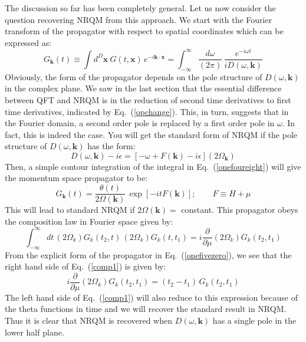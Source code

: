 \documentclass{article}
\def\eq#1{{Eq.~(\ref{#1})}}
\begin{document}
The discussion so far has been completely general. Let us now consider the question recovering NRQM from this approach. We start with the Fourier transform of the propagator with respect to spatial coordinates which can be expressed as:
\begin{equation}
 G_{\bm{k}} (t) \equiv \int d^D \bm{x}\ G(t,\bm{x})\, e^{-i\bm{k\cdot x}} = \int_{-\infty}^\infty \frac{d\omega}{(2\pi)} \, \frac{e^{-i\omega t}}{iD(\omega, \bm{k})} 
 \label{onefoureight}
\end{equation}
Obviously, the form of the propagator depends on the pole structure of $D(\omega, \bm{k})$ in the complex plane. We saw in the last section that the essential difference between QFT and NRQM is in the reduction of second time derivatives to first time derivatives, indicated by \eq{opchange}. This, in turn, suggests that in the Fourier domain, a second order pole is replaced by a first order pole in $\omega$. In fact,  
this is indeed the case.
You will get the standard form of NRQM if the pole structure of $D(\omega, \bm{k})$ has the form:
\begin{equation}
 D(\omega, \bm{k} ) - i \epsilon = \left[ - \omega + F(\bm{k}) - i \epsilon\right] (2\Omega_{\bm{k}})
\end{equation}
Then, a simple contour integration of the integral in \eq{onefoureight} will give the momentum space propagator to be:
\begin{equation}
G_{\bm{k}} (t) = \frac{\theta(t)}{2\Omega(\bm{k})} \, \exp\left[ - i t F(\bm{k})\right]; \qquad F\equiv H + \mu 
\label{onefivezero}
\end{equation} 
This will lead to standard NRQM if $2 \Omega(\bm{k})=$ constant. This propagator obeys  the composition law in Fourier space given by:
\begin{equation}
 \int_{-\infty}^\infty dt\, (2\Omega_k) G_k(t_2,t) \, (2\Omega_k) G_k(t,t_1) = i \frac{\partial}{\partial \mu} (2\Omega_k) G_k(t_2,t_1)
 \label{comp1}
\end{equation} 
From the explicit form of the propagator in \eq{onefivezero}, we see that the right hand side of \eq{comp1} is given by:
\begin{equation}
  i \frac{\partial}{\partial \mu} (2\Omega_k) G_k(t_2,t_1) = (t_2-t_1)\, G_k(t_2,t_1)
\end{equation} 
The left hand side of \eq{comp1} will also reduce to this expression because of the theta functions in time and we will recover the standard result in NRQM.  
Thus it is clear that NRQM is recovered when $D(\omega, \bm{k})$ has a single pole in the lower half plane. 
\end{document}
